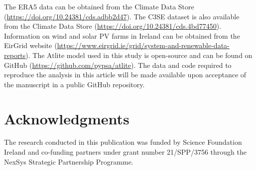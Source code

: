 \documentclass[preprint, 12pt]{elsarticle}
\begin{document}
The ERA5 data can be obtained from the Climate Data Store (\url{https://doi.org/10.24381/cds.adbb2d47}). The C3SE dataset is also available from the Climate Data Store (\url{https://doi.org/10.24381/cds.4bd77450}). Information on wind and solar PV farms in Ireland can be obtained from the EirGrid website (\url{https://www.eirgrid.ie/grid/system-and-renewable-data-reports}). The Atlite model used in this study is open-source and can be found on GitHub (\url{https://github.com/pypsa/atlite}). The data and code required to reproduce the analysis in this article will be made available upon acceptance of the manuscript in a public GitHub repository.

\section*{Acknowledgments}

The research conducted in this publication was funded by Science Foundation Ireland and co-funding partners under grant number 21/SPP/3756 through the NexSys Strategic Partnership Programme.



\end{document}

